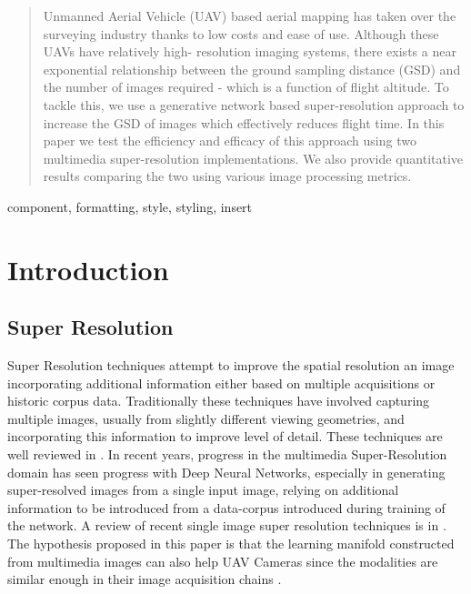 \documentclass[conference]{IEEEtran}
\begin{document}
\maketitle

\begin{abstract}
    Unmanned Aerial Vehicle (UAV) based aerial mapping has
    taken over the surveying industry thanks to low costs and
    ease of use. Although these UAVs have relatively high-
    resolution imaging systems, there exists a near exponential
    relationship between the ground sampling distance (GSD)
    and the number of images required - which is a function of
    flight altitude. To tackle this, we use a generative network
    based super-resolution approach to increase the GSD of
    images which effectively reduces flight time. In this paper
    we test the efficiency and efficacy of this approach using
    two multimedia super-resolution implementations. We also
    provide quantitative results comparing the two using various
    image processing metrics.
\end{abstract}

\begin{IEEEkeywords}
component, formatting, style, styling, insert
\end{IEEEkeywords}

\section{Introduction}
\subsection{Super Resolution}
Super Resolution techniques attempt to improve the spatial
resolution an image incorporating additional information
either based on multiple acquisitions or historic corpus data.
Traditionally these techniques have involved capturing
multiple images, usually from slightly different viewing
geometries, and incorporating this information to improve
level of detail. These techniques are well reviewed in \cite{yue2016image}.
In recent years, progress in the multimedia Super-Resolution
domain has seen progress with Deep Neural Networks,
especially in generating super-resolved images from a single
input image, relying on additional information to be
introduced from a data-corpus introduced during training of
the network. A review of recent single image super
resolution techniques is in \cite{bashir2021comprehensive}. \\
The hypothesis proposed in this paper is that the learning
manifold constructed from multimedia images can also help
UAV Cameras since the modalities are similar enough in
their image acquisition chains \cite{cramer2017uav}.
\end{document}
